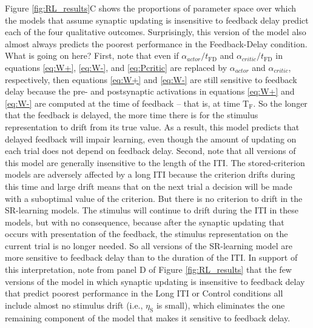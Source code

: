 \documentclass[doc, floatsintext]{apa7}
\begin{document}
Figure \ref{fig:RL_results}C shows the proportions of
parameter space over which the models that assume synaptic
updating is insensitive to feedback delay predict each of
the four qualitative outcomes. Surprisingly, this version of
the model also almost always predicts the poorest
performance in the Feedback-Delay condition. What is going
on here? First, note that even if
$\alpha_{actor}/t_\text{FD}$ and
$\alpha_{critic}/t_\text{FD}$ in equations \ref{eq:W+},
\ref{eq:W-}, and \ref{eq:Pcritic} are replaced by
$\alpha_{actor}$ and $\alpha_{critic}$, respectively, then
equations \ref{eq:W+} and \ref{eq:W-} are still sensitive to
feedback delay because the pre- and postsynaptic activations
in equations \ref{eq:W+} and \ref{eq:W-} are computed at the
time of feedback -- that is, at time T$_\text{F}$. So the
longer that the feedback is delayed, the more time there is
for the stimulus representation to drift from its true
value. As a result, this model predicts that delayed
feedback will impair learning, even though the amount of
updating on each trial does not depend on feedback delay.
Second, note that all versions of this model are generally
insensitive to the length of the ITI. The stored-criterion
models are adversely affected by a long ITI because the
criterion drifts during this time and large drift means that
on the next trial a decision will be made with a suboptimal
value of the criterion. But there is no criterion to drift
in the SR-learning models. The stimulus will continue to
drift during the ITI in these models, but with no
consequence, because after the synaptic updating that occurs
with presentation of the feedback, the stimulus
representation on the current trial is no longer needed. So
all versions of the SR-learning model are more sensitive to
feedback delay than to the duration of the ITI. In support
of this interpretation, note from panel D of Figure
\ref{fig:RL_results} that the few versions of the model in
which synaptic updating is insensitive to feedback delay
that predict poorest performance in the Long ITI or Control
conditions all include almost no stimulus drift (i.e.,
$\eta_\text{S}$ is small), which eliminates the one
remaining component of the model that makes it sensitive to
feedback delay.
\end{document}
